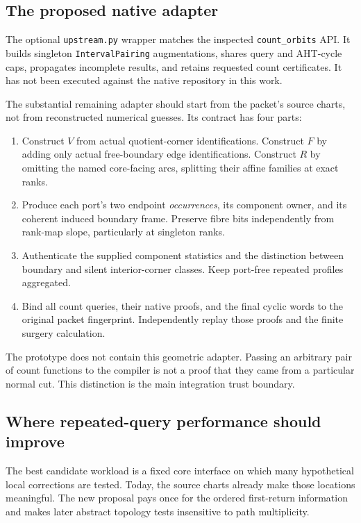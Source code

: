 \documentclass[11pt]{article}
\theoremstyle{definition}
\theoremstyle{remark}\newtheorem{remark}[theorem]{Remark}
\newcommand{\code}[1]{\texttt{#1}}
\begin{document}
\subsection{The proposed native adapter}
The optional \code{upstream.py} wrapper matches the inspected \code{count\_orbits} API. It builds singleton \code{IntervalPairing} augmentations, shares query and AHT-cycle caps, propagates incomplete results, and retains requested count certificates. It has not been executed against the native repository in this work.

The substantial remaining adapter should start from the packet's source charts, not from reconstructed numerical guesses. Its contract has four parts:
\begin{enumerate}
\item Construct $V$ from actual quotient-corner identifications. Construct $F$ by adding only actual free-boundary edge identifications. Construct $R$ by omitting the named core-facing arcs, splitting their affine families at exact ranks.
\item Produce each port's two endpoint \emph{occurrences}, its component owner, and its coherent induced boundary frame. Preserve fibre bits independently from rank-map slope, particularly at singleton ranks.
\item Authenticate the supplied component statistics and the distinction between boundary and silent interior-corner classes. Keep port-free repeated profiles aggregated.
\item Bind all count queries, their native proofs, and the final cyclic words to the original packet fingerprint. Independently replay those proofs and the finite surgery calculation.
\end{enumerate}

The prototype does not contain this geometric adapter. Passing an arbitrary pair of count functions to the compiler is not a proof that they came from a particular normal cut. This distinction is the main integration trust boundary.

\subsection{Where repeated-query performance should improve}
The best candidate workload is a fixed core interface on which many hypothetical local corrections are tested. Today, the source charts already make those locations meaningful. The new proposal pays once for the ordered first-return information and makes later abstract topology tests insensitive to path multiplicity.
\end{document}
